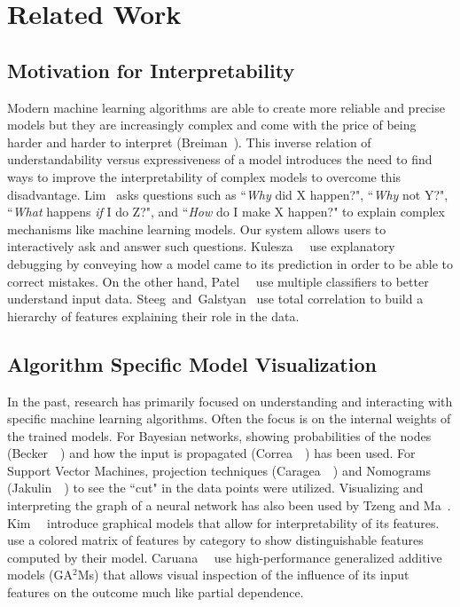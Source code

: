
\section{Related Work}

\subsection{Motivation for Interpretability}
Modern machine learning algorithms are able to create more reliable and precise models
but they are increasingly complex and come with the price of being harder and harder to interpret (Breiman~\cite{breiman2001}).
This inverse relation of understandability versus expressiveness of a model introduces the need
to find ways to improve the interpretability of complex models to overcome this disadvantage.
Lim~\cite{Lim:2012:IUT:2518922} asks questions such as ``\emph{Why} did X happen?",
``\emph{Why} not Y?", ``\emph{What} happens \emph{if} I do Z?", and ``\emph{How} do I make X happen?"
to explain complex mechanisms like machine learning models.
Our system allows users to interactively ask and answer such questions.
Kulesza~\etal~\cite{Kulesza:2015:PED:2678025.2701399} use explanatory debugging by conveying how a model
came to its prediction in order to be able to correct mistakes.
On the other hand, Patel~\etal~\cite{DBLP:conf/ijcai/PatelDFKT11} use multiple classifiers
to better understand input data.
Steeg~and~Galstyan~\cite{NIPS2014_5580,steeg2015corex_theory} use total correlation to build
a hierarchy of features explaining their role in the data.

\subsection{Algorithm Specific Model Visualization}
In the past, research has primarily focused on understanding and interacting with specific machine learning algorithms.
Often the focus is on the internal weights of the trained models.
For Bayesian networks, showing probabilities of the nodes (Becker~\etal~\cite{Becker:2001:VSB:383784.383809}) and how the input is propagated (Correa~\etal~\cite{DBLP:journals/isci/MartinsONHC13})
has been used.
For Support Vector Machines,
projection techniques (Caragea~\etal~\cite{Caragea2001}) and
Nomograms (Jakulin~\etal~\cite{Jakulin:2005:NVS:1081870.1081886})
to see the ``cut" in the data points were utilized.
Visualizing and interpreting the graph of a neural network has also been used by Tzeng and Ma~\cite{Tzeng:2005:OTB}.
Kim~\etal~\cite{kim2014bayesian,kim2015MGM} introduce graphical models that allow for
interpretability of its features.
\cite{kim2015MGM} use a colored matrix of features by category to show distinguishable features computed by their model.
Caruana~\etal~\cite{Caruana:2015:IMH:2783258.2788613} use high-performance generalized additive models (GA$^2$Ms) that allows visual inspection of the influence of its input features on the outcome much like partial dependence.


